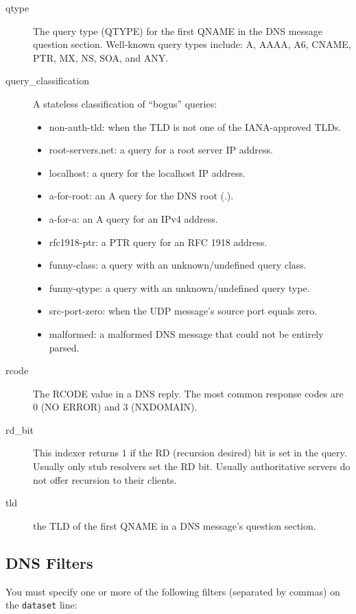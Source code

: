 \documentclass{report}
\begin{document}
\begin{description}
\item[qtype]
	The query type (QTYPE) for the first QNAME in the DNS message
	question section.  Well-known query types include: A, AAAA,
	A6, CNAME, PTR, MX, NS, SOA, and ANY.
\item[query\_classification]
	A stateless classification of ``bogus'' queries:
	\begin{itemize}
	\setlength{\itemsep}{0ex plus 0.5ex minus 0.0ex}
	\item non-auth-tld: when the TLD is not one of the IANA-approved TLDs.
	\item root-servers.net: a query for a root server IP address.
	\item localhost: a query for the localhost IP address.
	\item a-for-root: an A query for the DNS root (.).
	\item a-for-a: an A query for an IPv4 address.
	\item rfc1918-ptr: a PTR query for an RFC 1918 address.
	\item funny-class: a query with an unknown/undefined query class.
	\item funny-qtype: a query with an unknown/undefined query type.
	\item src-port-zero: when the UDP message's source port equals zero.
	\item malformed: a malformed DNS message that could not be entirely parsed.
	\end{itemize}
\item[rcode]
	The RCODE value in a DNS reply.  The most common response
	codes are 0 (NO ERROR) and 3 (NXDOMAIN). 
\item[rd\_bit]
	This indexer returns 1 if the RD (recursion desired) bit is
	set in the query.  Usually only stub resolvers set the RD bit.
	Usually authoritative servers do not offer recursion to their
	clients.
\item[tld]
	the TLD of the first QNAME in a DNS message's question section.
\end{description}

\subsection{DNS Filters}

You must specify one or more of the following filters (separated by commas) on
the {\tt dataset\/} line:
\end{document}
